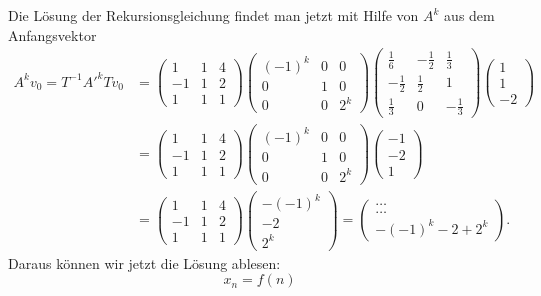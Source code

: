 \begin{loesung}
Die Lösung der Rekursionsgleichung findet man jetzt mit Hilfe von $A^k$
aus dem Anfangsvektor
\begin{align*}
A^kv_0
=
T^{-1}A'^kTv_0
&=
\begin{pmatrix}
 1&1&4\\
-1&1&2\\
 1&1&1
\end{pmatrix}
\begin{pmatrix}
(-1)^k& 0& 0\\
     0& 1& 0\\
     0& 0& 2^k
\end{pmatrix}
\begin{pmatrix}
 \frac16&-\frac12& \frac13\\
-\frac12& \frac12&1      \\
 \frac13&   0    &-\frac13
\end{pmatrix}
\begin{pmatrix}
1\\1\\-2
\end{pmatrix}
\\
&=
\begin{pmatrix}
 1&1&4\\
-1&1&2\\
 1&1&1
\end{pmatrix}
\begin{pmatrix}
(-1)^k& 0& 0\\
     0& 1& 0\\
     0& 0& 2^k
\end{pmatrix}
\begin{pmatrix}
-1\\-2\\1
\end{pmatrix}
\\
&=
\begin{pmatrix}
 1&1&4\\
-1&1&2\\
 1&1&1
\end{pmatrix}
\begin{pmatrix}
-(-1)^k\\
-2\\
2^k
\end{pmatrix}
=
\begin{pmatrix}
\dots\\
\dots\\
-(-1)^k
-2
+
2^k
\end{pmatrix}.
\end{align*}
Daraus können wir jetzt die Lösung ablesen:
\[
x_n
=
f(n)
\]
\end{loesung}
